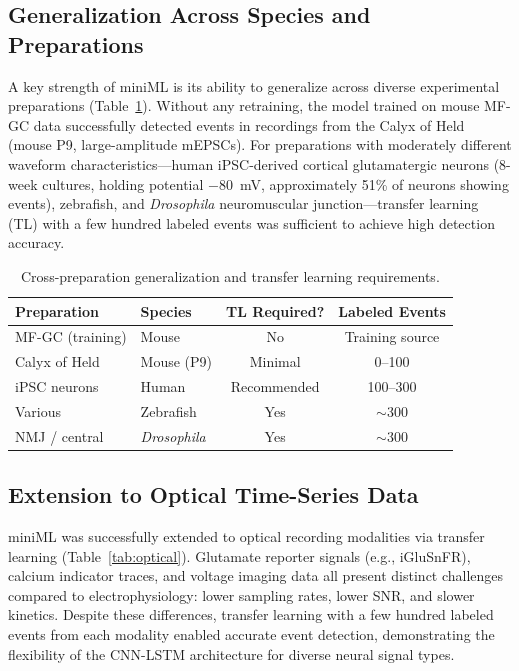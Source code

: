 \documentclass[11pt]{article}
\begin{document}
\subsection{Generalization Across Species and Preparations}

A key strength of miniML is its ability to generalize across diverse experimental preparations (Table~\ref{tab:generalization}). Without any retraining, the model trained on mouse MF-GC data successfully detected events in recordings from the Calyx of Held (mouse P9, large-amplitude mEPSCs). For preparations with moderately different waveform characteristics---human iPSC-derived cortical glutamatergic neurons (8-week cultures, holding potential $-80$~mV, approximately 51\% of neurons showing events), zebrafish, and \textit{Drosophila} neuromuscular junction---transfer learning (TL) with a few hundred labeled events was sufficient to achieve high detection accuracy.

\begin{table}[H]
\centering
\caption{Cross-preparation generalization and transfer learning requirements.}
\label{tab:generalization}
\begin{tabular}{llcc}
\toprule
Preparation & Species & TL Required? & Labeled Events \\
\midrule
MF-GC (training) & Mouse & No & Training source \\
Calyx of Held & Mouse (P9) & Minimal & 0--100 \\
iPSC neurons & Human & Recommended & 100--300 \\
Various & Zebrafish & Yes & $\sim$300 \\
NMJ / central & \textit{Drosophila} & Yes & $\sim$300 \\
\bottomrule
\end{tabular}
\end{table}

\subsection{Extension to Optical Time-Series Data}

miniML was successfully extended to optical recording modalities via transfer learning (Table~\ref{tab:optical}). Glutamate reporter signals (e.g., iGluSnFR), calcium indicator traces, and voltage imaging data all present distinct challenges compared to electrophysiology: lower sampling rates, lower SNR, and slower kinetics. Despite these differences, transfer learning with a few hundred labeled events from each modality enabled accurate event detection, demonstrating the flexibility of the CNN-LSTM architecture for diverse neural signal types.
\end{document}
